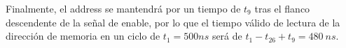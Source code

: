 Finalmente, el address se mantendrá por un tiempo de $t_9$ tras el flanco descendente de la señal de enable, por lo que el tiempo válido de lectura de la dirección de memoria en un ciclo de $t_1 = 500ns$ será de $t_1 - t_{26} + t_{9} = 480 \ ns$.
 
 
 
 
 
 
 
 
 
 
 
 
 
 
 
 
 
 
 
 
 
 
 
 
 
 
 
 
 
 
 
 

